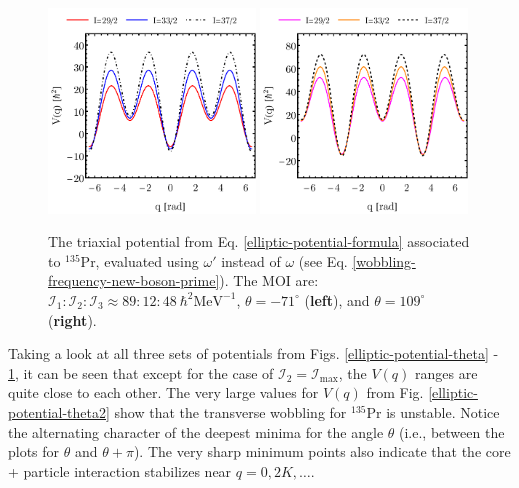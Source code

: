\begin{figure}
    \centering
    \includegraphics[width=0.49\textwidth]{Chapters/Figures/potential-fit3-theta.pdf}
    \includegraphics[width=0.49\textwidth]{Chapters/Figures/potential-fit3-theta-pi.pdf}
    \caption{The triaxial potential from Eq. \ref{elliptic-potential-formula} associated to $^{135}$Pr, evaluated using $\omega'$ instead of $\omega$ (see Eq. \ref{wobbling-frequency-new-boson-prime}). The MOI are: $\mathcal{I}_1:\mathcal{I}_2:\mathcal{I}_3\approx89:12:48\ \hbar^2\text{MeV}^{-1}$, $\theta=-71^\circ$ (\textbf{left}), and $\theta=109^\circ$ (\textbf{right}).}
    \label{elliptic-potential-theta3}
\end{figure}

Taking a look at all three sets of potentials from Figs. \ref{elliptic-potential-theta} - \ref{elliptic-potential-theta3}, it can be seen that except for the case of $\mathcal{I}_2=\mathcal{I}_\text{max}$, the $V(q)$ ranges are quite close to each other. The very large values for $V(q)$ from Fig. \ref{elliptic-potential-theta2} show that the transverse wobbling for $^{135}$Pr is unstable. Notice the alternating character of the deepest minima for the angle $\theta$ (i.e., between the plots for $\theta$ and $\theta+\pi$). The very sharp minimum points also indicate that the core + particle interaction stabilizes near $q=0,2K,\dots$. 


